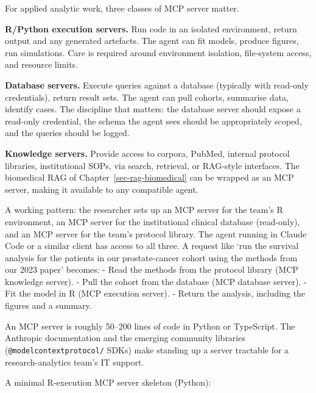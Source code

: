 \documentclass[
  letterpaper,
  11pt]{scrbook}
\begin{document}
For applied analytic work, three classes of MCP server matter.

\textbf{R/Python execution servers.} Run code in an isolated
environment, return output and any generated artefacts. The agent can
fit models, produce figures, run simulations. Care is required around
environment isolation, file-system access, and resource limits.

\textbf{Database servers.} Execute queries against a database (typically
with read-only credentials), return result sets. The agent can pull
cohorts, summarise data, identify cases. The discipline that matters:
the database server should expose a read-only credential, the schema the
agent sees should be appropriately scoped, and the queries should be
logged.

\textbf{Knowledge servers.} Provide access to corpora, PubMed, internal
protocol libraries, institutional SOPs, via search, retrieval, or
RAG-style interfaces. The biomedical RAG of
Chapter~\ref{sec-rag-biomedical} can be wrapped as an MCP server, making
it available to any compatible agent.

A working pattern: the researcher sets up an MCP server for the team's R
environment, an MCP server for the institutional clinical database
(read-only), and an MCP server for the team's protocol library. The
agent running in Claude Code or a similar client has access to all
three. A request like `run the survival analysis for the patients in our
prostate-cancer cohort using the methods from our 2023 paper' becomes: -
Read the methods from the protocol library (MCP knowledge server). -
Pull the cohort from the database (MCP database server). - Fit the model
in R (MCP execution server). - Return the analysis, including the
figures and a summary.

An MCP server is roughly 50--200 lines of code in Python or TypeScript.
The Anthropic documentation and the emerging community libraries
(\texttt{@modelcontextprotocol/} SDKs) make standing up a server
tractable for a research-analytics team's IT support.

A minimal R-execution MCP server skeleton (Python):
\end{document}
